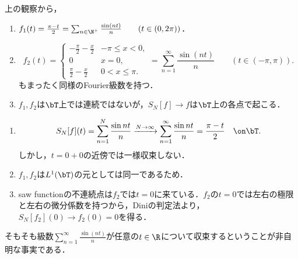 \documentclass[uplatex,dvipdfmx]{jsreport}
\begin{document}
\begin{example}\label{exp-pi-t-2}
    上の観察から，
    \begin{enumerate}
        \item $f_1(t)=\frac{\pi-t}{2}=\sum_{n\in\N^+}\frac{\sin(nt)}{n}\qquad(t\in(0,2\pi))$．
        \item \[f_2(t)=\begin{cases}
            -\frac{\pi}{2}-\frac{x}{2}&-\pi\le x<0,\\
            0&x=0,\\
            \frac{\pi}{2}-\frac{x}{2}&0<x\le\pi.
        \end{cases}=\sum_{n=1}^\infty\frac{\sin(nt)}{n}\qquad(t\in(-\pi,\pi)).\]
        もまったく同様のFourier級数を持つ．
        \item $f_1,f_2$は$\bT$上では連続ではないが，$S_N[f]\to f$は$\bT$上の各点で起こる．
    \end{enumerate}
\end{example}
\begin{Proof}\mbox{}
    \begin{enumerate}
        \item  \[S_N[f](t)=\sum_{n=1}^N\frac{\sin nt}{n}\xrightarrow{N\to\infty}\sum_{n=1}^\infty\frac{\sin nt}{n}=\frac{\pi-t}{2}\quad\on\bT.\]
        しかし，$t=0+0$の近傍では一様収束しない．
        \item $f_1,f_2$は$L^1(\bT)$の元としては同一であるため．
        \item saw functionの不連続点は$f_2$では$t=0$に来ている．$f_2$の$t=0$では左右の極限と左右の微分係数を持つから，Diniの判定法より，$S_N[f_2](0)\to f_2(0)=0$を得る．
    \end{enumerate}
\end{Proof}
\begin{remarks}
    そもそも級数$\sum_{n=1}^\infty\frac{\sin(nt)}{n}$が任意の$t\in\R$について収束するということが非自明な事実である．
\end{remarks}
\end{document}
